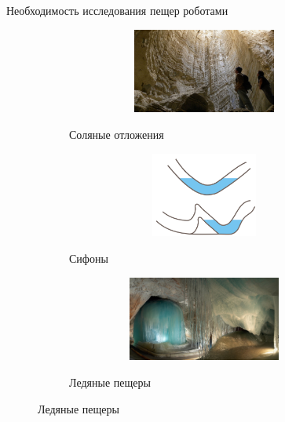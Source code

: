 \documentclass[aspectratio=169,xcolor=table,10pt]{beamer}
\begin{document}
\begin{frame}[t]{Необходимость исследования пещер роботами}
    \vspace{-0.85cm}
    \begin{figure}[H]
        \begin{subfigure}[b]{0.3\textwidth}
            \centering\includegraphics[height=2.8cm,width=1\textwidth,keepaspectratio]{surface_types/salt.jpg}\\
            \caption*{Соляные отложения}
            \label{fig:surface_types/salt}
        \end{subfigure}
        \hfill
        \begin{subfigure}[b]{0.3\textwidth}
            \centering\includegraphics[height=2.8cm,width=1\textwidth,keepaspectratio]{surface_types/siphon.png}\\
            \caption*{Сифоны}
            \label{fig:surface_types/siphon}
        \end{subfigure}
        \hfill
        \begin{subfigure}[b]{0.3\textwidth}
            \centering\includegraphics[height=2.8cm,width=1\textwidth,keepaspectratio]{surface_types/ice.png}\\
            \caption*{Ледяные пещеры}
            \label{fig:surface_types/ice}
        \end{subfigure}


\end{figure}
\end{frame}
\end{document}
